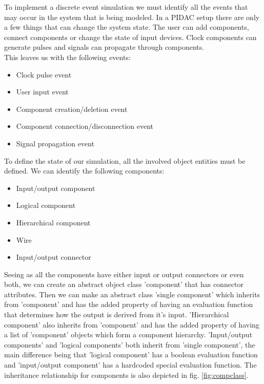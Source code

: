 \documentclass[twoside]{uva-inf-bachelor-thesis}
\begin{document}
To implement a discrete event simulation we must identify all the events that may occur in the system that is being modeled. In a PIDAC setup there are only a few things that can change the system state. The user can add components, connect components or change the state of input devices. Clock components can generate pulses and signals can propagate through components.
\\
This leaves us with the following events:
\begin{itemize}
  \item Clock pulse event
  \item User input event
  \item Component creation/deletion event
  \item Component connection/disconnection event
  \item Signal propagation event
\end{itemize}
$~$
\\
To define the state of our simulation, all the involved object entities must be defined. We can identify the following components:
\begin{itemize}
  \item Input/output component
  \item Logical component
  \item Hierarchical component
  \item Wire
  \item Input/output connector
\end{itemize}
$~$
\\
Seeing as all the components have either input or output connectors or even both, we can create an abstract object class 'component' that has connector attributes. Then we can make an abstract class 'single component' which inherits from 'component' and has the added property of having an evaluation function that determines how the output is derived from it's input. 
'Hierarchical component' also inherits from 'component' and has the added property of having a list of 'component' objects which form a component hierarchy. 'Input/output components' and 'logical components' both inherit from 'single component', the main difference being that 'logical component' has a boolean evaluation function and 'input/output component' has a hardcoded special evaluation function. The inheritance relationship for components is also depicted in fig. \ref{fig:compclass}.
\end{document}
